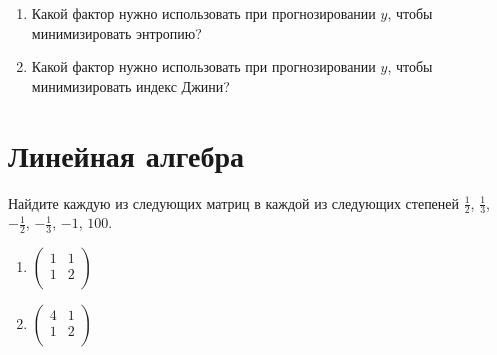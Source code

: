\documentclass[pdftex,11pt,openany]{book}\usepackage[]{graphicx}\usepackage[]{color}
\begin{document}
\begin{problem}
\begin{enumerate}
\item Какой фактор нужно использовать при прогнозировании $y$, чтобы минимизировать энтропию?
\item Какой фактор нужно использовать при прогнозировании $y$, чтобы минимизировать индекс Джини?
\end{enumerate}
\end{problem}

\begin{solution}
\end{solution}












\chapter{Линейная алгебра}


\begin{problem}
Найдите каждую из следующих матриц в каждой из следующих степеней $\frac{1}{2}$, $\frac{1}{3}$, $-\frac{1}{2}$, $-\frac{1}{3}$, $-1$, $100$.
\begin{enumerate}
\item
\ensuremath{%
\begin{pmatrix}{}
    1 &   1 \\ 
    1 &   2 \\ 
  \end{pmatrix}
}
\item
\ensuremath{%
\begin{pmatrix}{}
    4 &   1 \\ 
    1 &   2 \\ 
  \end{pmatrix}
}
\end{enumerate}
\end{problem}

\begin{solution}
\end{solution}
\end{document}
